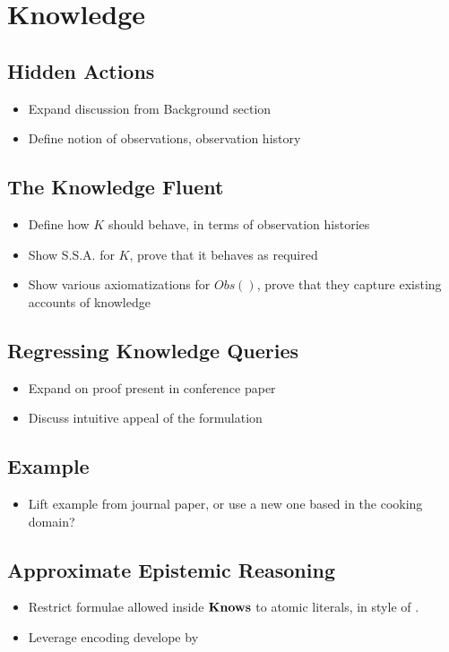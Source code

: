 


\chapter{Knowledge}

\label{ch:knowledge} %



\section{Hidden Actions}

\begin{itemize}
\item Expand discussion from Background section
\item Define notion of observations, observation history 
\end{itemize}

\section{The Knowledge Fluent}

\begin{itemize}
\item Define how $K$ should behave, in terms of observation histories 
\item Show S.S.A. for $K$, prove that it behaves as required 
\item Show various axiomatizations for $Obs()$, prove that they capture
existing accounts of knowledge 
\end{itemize}

\section{Regressing Knowledge Queries}

\begin{itemize}
\item Expand on proof present in conference paper 
\item Discuss intuitive appeal of the formulation 
\end{itemize}

\section{Example}

\begin{itemize}
\item Lift example from journal paper, or use a new one based in the cooking
domain? 
\end{itemize}

\section{Approximate Epistemic Reasoning}

\begin{itemize}
\item Restrict formulae allowed inside $\mathbf{Knows}$ to atomic literals, in
style of \cite{demolombe00tractable_sc_belief}. 
\item Leverage encoding develope by \cite{petrick02knowledge_equivalence} 
\end{itemize}
